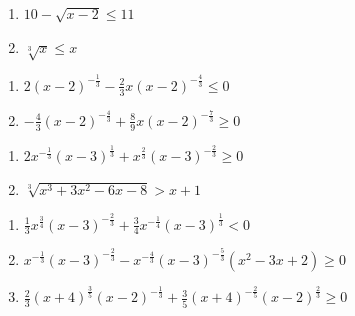 \begin{multicols}{2}
\begin{enumerate}
\setcounter{enumi}{\value{HW}}


\item  $10-\sqrt{x-2} \leq 11$
\item $\sqrt[3]{x} \leq x$

\setcounter{HW}{\value{enumi}}
\end{enumerate}
\end{multicols}

\begin{multicols}{2}
\begin{enumerate}
\setcounter{enumi}{\value{HW}}


\item  $2 (x-2)^{-\frac{1}{3}} -\frac{2}{3} x(x-2)^{-\frac{4}{3}} \leq 0$
\item  $-\frac{4}{3} (x-2)^{-\frac{4}{3}} + \frac{8}{9} x (x-2)^{-\frac{7}{3}} \geq 0$

\setcounter{HW}{\value{enumi}}
\end{enumerate}
\end{multicols}

\begin{multicols}{2}
\begin{enumerate}
\setcounter{enumi}{\value{HW}}


\item  $2x^{-\frac{1}{3}}(x-3)^{\frac{1}{3}} + x^{\frac{2}{3}} (x-3)^{-\frac{2}{3}} \geq 0$
\item $\sqrt[3]{x^{3} + 3x^{2} - 6x - 8} > x + 1$


\setcounter{HW}{\value{enumi}}
\end{enumerate}
\end{multicols}

\begin{enumerate}
\setcounter{enumi}{\value{HW}}

\item $\frac{1}{3}x^{\frac{3}{4}}(x - 3)^{-\frac{2}{3}} + \frac{3}{4}x^{-\frac{1}{4}}(x - 3)^{\frac{1}{3}} < 0$
\item $x^{-\frac{1}{3}} (x-3)^{-\frac{2}{3}} - x^{-\frac{4}{3}} (x-3)^{-\frac{5}{3}} (x^2-3x+2) \geq 0$ 
\item $\frac{2}{3}(x + 4)^{\frac{3}{5}}(x - 2)^{-\frac{1}{3}} + \frac{3}{5}(x + 4)^{-\frac{2}{5}}(x - 2)^{\frac{2}{3}} \geq 0$ \label{algineqexlast}



\setcounter{HW}{\value{enumi}}
\end{enumerate}

